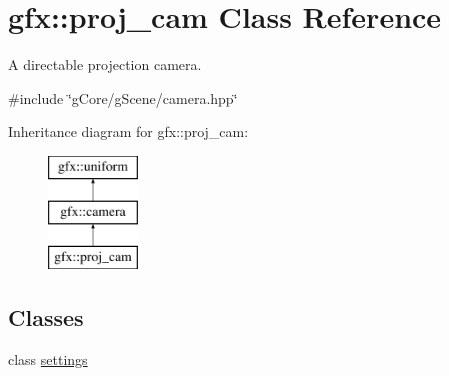 \hypertarget{classgfx_1_1proj__cam}{\section{gfx\-:\-:proj\-\_\-cam Class Reference}
\label{classgfx_1_1proj__cam}
}


A directable projection camera.  




{\ttfamily \#include \char`\"{}g\-Core/g\-Scene/camera.\-hpp\char`\"{}}

Inheritance diagram for gfx\-:\-:proj\-\_\-cam\-:\begin{figure}[H]
\begin{center}
\leavevmode
\includegraphics[height=3.000000cm]{classgfx_1_1proj__cam}
\end{center}
\end{figure}
\subsection*{Classes}
\begin{DoxyCompactItemize}
\item 
class \hyperlink{classgfx_1_1proj__cam_1_1settings}{settings}
\end{DoxyCompactItemize}
